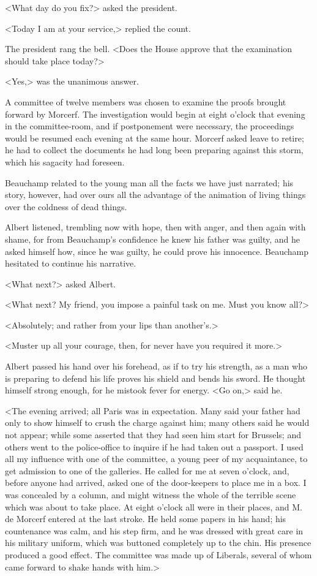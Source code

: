  <What day do you fix?> asked the president. 

 <Today I am at your service,> replied the count. 

 The president rang the bell. <Does the House approve that the examination should take place today?>  
 
 <Yes,> was the unanimous answer. 

 A committee of twelve members was chosen to examine the proofs brought forward by Morcerf. The investigation would begin at eight o'clock that evening in the committee-room, and if postponement were necessary, the proceedings would be resumed each evening at the same hour. Morcerf asked leave to retire; he had to collect the documents he had long been preparing against this storm, which his sagacity had foreseen. 

 Beauchamp related to the young man all the facts we have just narrated; his story, however, had over ours all the advantage of the animation of living things over the coldness of dead things. 

 Albert listened, trembling now with hope, then with anger, and then again with shame, for from Beauchamp's confidence he knew his father was guilty, and he asked himself how, since he was guilty, he could prove his innocence. Beauchamp hesitated to continue his narrative. 

 <What next?> asked Albert. 

 <What next? My friend, you impose a painful task on me. Must you know all?> 

 <Absolutely; and rather from your lips than another's.> 

 <Muster up all your courage, then, for never have you required it more.> 

 Albert passed his hand over his forehead, as if to try his strength, as a man who is preparing to defend his life proves his shield and bends his sword. He thought himself strong enough, for he mistook fever for energy. <Go on,> said he. 

<The evening arrived; all Paris was in expectation. Many said your father had only to show himself to crush the charge against him; many others said he would not appear; while some asserted that they had seen him start for Brussels; and others went to the police-office to inquire if he had taken out a passport. I used all my influence with one of the committee, a young peer of my acquaintance, to get admission to one of the galleries. He called for me at seven o'clock, and, before anyone had arrived, asked one of the door-keepers to place me in a box. I was concealed by a column, and might witness the whole of the terrible scene which was about to take place. At eight o'clock all were in their places, and M. de Morcerf entered at the last stroke. He held some papers in his hand; his countenance was calm, and his step firm, and he was dressed with great care in his military uniform, which was buttoned completely up to the chin. His presence produced a good effect. The committee was made up of Liberals, several of whom came forward to shake hands with him.> 

